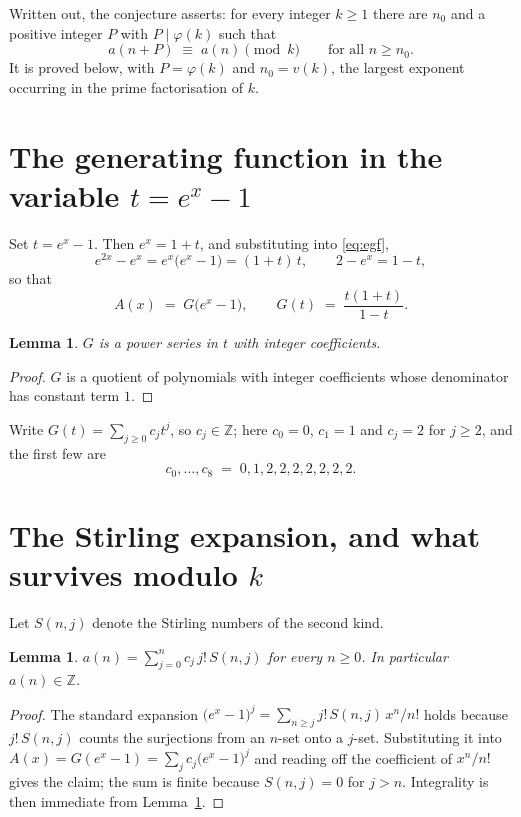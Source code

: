 \documentclass[11pt,a4paper]{article}
\theoremstyle{plain}
\newtheorem{lemma}[theorem]{Lemma}
\theoremstyle{definition}
\begin{document}
Written out, the conjecture asserts: for every integer $k\ge 1$ there are $n_0$ and a
positive integer $P$ with $P\mid\varphi(k)$ such that
\begin{equation}\label{eq:conj}
a(n+P)\;\equiv\;a(n)\pmod{k}\qquad\text{for all } n\ge n_0 .
\end{equation}
It is proved below, with $P=\varphi(k)$ and $n_0=v(k)$, the largest exponent occurring in
the prime factorisation of $k$.

\section{The generating function in the variable $t=e^{x}-1$}

Set $t=e^{x}-1$. Then $e^{x}=1+t$, and substituting into \eqref{eq:egf},
\[
e^{2x}-e^{x}=e^{x}\bigl(e^{x}-1\bigr)=(1+t)\,t,\qquad 2-e^{x}=1-t,
\]
so that
\begin{equation}\label{eq:G}
A(x)\;=\;G\bigl(e^{x}-1\bigr),\qquad
G(t)\;=\;\frac{t(1+t)}{1-t}.
\end{equation}

\begin{lemma}\label{lem:int}
$G$ is a power series in $t$ with integer coefficients.
\end{lemma}

\begin{proof}
$G$ is a quotient of polynomials with integer coefficients whose denominator has constant term $1$.
\end{proof}

Write $G(t)=\sum_{j\ge0}c_j t^{j}$, so $c_j\in\mathbb{Z}$; here $c_0=0$, $c_1=1$ and $c_j=2$ for $j\ge 2$, and the
first few are
\[
c_0,\dots,c_8 \;=\; 0, 1, 2, 2, 2, 2, 2, 2, 2.
\]

\section{The Stirling expansion, and what survives modulo $k$}

Let $S(n,j)$ denote the Stirling numbers of the second kind.

\begin{lemma}\label{lem:stir}
$a(n)=\sum_{j=0}^{n} c_j\, j!\, S(n,j)$ for every $n\ge 0$. In particular $a(n)\in\mathbb{Z}$.
\end{lemma}

\begin{proof}
The standard expansion $\bigl(e^{x}-1\bigr)^{j}
=\sum_{n\ge j} j!\,S(n,j)\,x^{n}/n!$ holds because $j!\,S(n,j)$ counts the surjections
from an $n$-set onto a $j$-set. Substituting it into
$A(x)=G(e^{x}-1)=\sum_j c_j\bigl(e^{x}-1\bigr)^{j}$ and reading off the coefficient of
$x^{n}/n!$ gives the claim; the sum is finite because $S(n,j)=0$ for $j>n$. Integrality is
then immediate from Lemma~\ref{lem:int}.
\end{proof}
\end{document}
